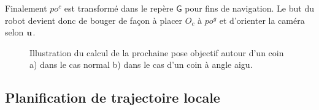 Finalement ${po^c}$ est transformé dans le repère $\mathsf{G}$ pour fins de navigation. Le but du robot devient donc de bouger de façon à placer $O_c$ à ${po^g}$ et d'orienter la caméra selon $\mathbf{u}$.

\begin{figure}[ht]
  \centering
  \hfil
  \caption[Illustration du calcul de la prochaine pose objectif]{
    Illustration du calcul de la prochaine pose objectif autour d'un coin a) dans le cas normal b) dans le cas d'un coin à angle aigu.
  }
  \label{fig:ugv_goal_determination}
\end{figure}

\subsection{Planification de trajectoire locale}

